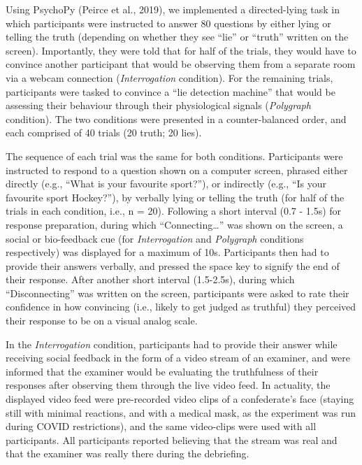 \documentclass[
  man,mask,floatsintext]{apa6}
\begin{document}
Using PsychoPy (Peirce et al., 2019), we implemented a directed-lying task in which participants were instructed to answer 80 questions by either lying or telling the truth (depending on whether they see ``lie'' or ``truth'' written on the screen). Importantly, they were told that for half of the trials, they would have to convince another participant that would be observing them from a separate room via a webcam connection (\emph{Interrogation} condition). For the remaining trials, participants were tasked to convince a ``lie detection machine'' that would be assessing their behaviour through their physiological signals (\emph{Polygraph} condition). The two conditions were presented in a counter-balanced order, and each comprised of 40 trials (20 truth; 20 lies).

The sequence of each trial was the same for both conditions. Participants were instructed to respond to a question shown on a computer screen, phrased either directly (e.g., ``What is your favourite sport?''), or indirectly (e.g., ``Is your favourite sport Hockey?''), by verbally lying or telling the truth (for half of the trials in each condition, i.e., n = 20). Following a short interval (0.7 - 1.5s) for response preparation, during which ``Connecting\ldots{}'' was shown on the screen, a social or bio-feedback cue (for \emph{Interrogation} and \emph{Polygraph} conditions respectively) was displayed for a maximum of 10s. Participants then had to provide their answers verbally, and pressed the space key to signify the end of their response. After another short interval (1.5-2.5s), during which ``Disconnecting'' was written on the screen, participants were asked to rate their confidence in how convincing (i.e., likely to get judged as truthful) they perceived their response to be on a visual analog scale.

In the \emph{Interrogation} condition, participants had to provide their answer while receiving social feedback in the form of a video stream of an examiner, and were informed that the examiner would be evaluating the truthfulness of their responses after observing them through the live video feed. In actuality, the displayed video feed were pre-recorded video clips of a confederate's face (staying still with minimal reactions, and with a medical mask, as the experiment was run during COVID restrictions), and the same video-clips were used with all participants. All participants reported believing that the stream was real and that the examiner was really there during the debriefing.
\end{document}
